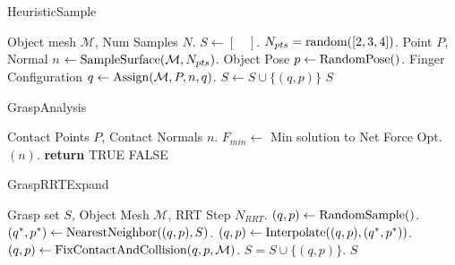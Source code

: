 \begin{algorithm}[htbp]
\caption{HeuristicSample}\label{alg:hsample}
\begin{algorithmic}[1]
\REQUIRE Object mesh $\mathcal{M}$, Num Samples $N$.
\STATE $S\leftarrow [\quad]$.
\STATE $N_{pts}=\rm random([2,3,4])$.   
\STATE Point $P$, Normal $n$ $\leftarrow {\rm SampleSurface}(\mathcal{M}, N_{pts})$.
    \STATE Object Pose $p\leftarrow {\rm RandomPose()}$.
    \STATE Finger Configuration $q\leftarrow {\rm Assign}(\mathcal{M}, P, n, q)$.
    \STATE $S\leftarrow S\cup \{(q, p)\}$
    \ENDIF 
\ENDIF
\ENDWHILE
\RETURN $S$
\end{algorithmic}
\end{algorithm}

\begin{algorithm}[htbp]
\caption{GraspAnalysis}\label{alg:analysis}
\begin{algorithmic}[1]
\REQUIRE Contact Points $P$, Contact Normals $n$.
\STATE $F_{min}\leftarrow$ Min solution to Net Force Opt. $(n)$.
\STATE \textbf{return}  TRUE
\ENDIF 
\RETURN FALSE
\end{algorithmic}
\end{algorithm}


\begin{algorithm}[t]
\caption{GraspRRTExpand}\label{alg:analysis}
\begin{algorithmic}[1]
\REQUIRE Grasp set $S$, Object Mesh $\mathcal{M}$, RRT Step $N_{RRT}$.
\STATE $(q, p)\leftarrow {\rm RandomSample()}$. 
\STATE $(q^*, p^*)\leftarrow {\rm NearestNeighbor}((q,p), S)$.
\STATE $(q, p)\leftarrow{\rm Interpolate}((q,p), (q^*, p^*))$.
\STATE $(q, p)\leftarrow {\rm FixContactAndCollision}(q, p, \mathcal{M})$.
\STATE $S=S\cup \{(q, p)\}$.
\ENDFOR
\RETURN $S$
\end{algorithmic}
\end{algorithm}

